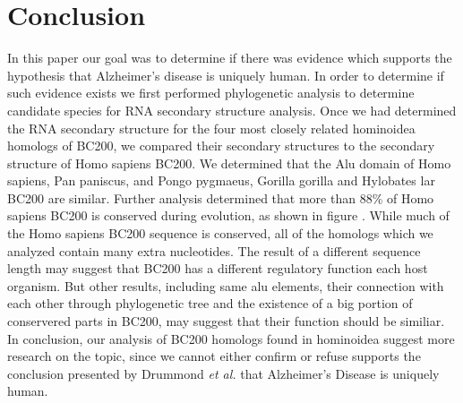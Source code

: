 \documentclass[conference, 11pt]{IEEEtran}
\begin{document}
\section{Conclusion}\label{sec:conclusion}

In this paper our goal was to determine if there was evidence which supports the hypothesis that Alzheimer’s disease is uniquely human. In order to determine if such evidence exists we first performed phylogenetic analysis to determine candidate species for RNA secondary structure analysis. Once we had determined the RNA secondary structure for the four most closely related hominoidea homologs of BC200, we compared their secondary structures to the secondary structure of Homo sapiens BC200. We determined that the Alu domain of Homo sapiens, Pan paniscus, and Pongo pygmaeus, Gorilla gorilla and Hylobates lar BC200 are similar. Further analysis determined that more than 88\% of Homo sapiens BC200 is conserved during evolution, as shown in figure . While much of the Homo sapiens BC200 sequence is conserved, all of the homologs which we analyzed contain many extra nucleotides. The result of a different sequence length may suggest that BC200 has a different regulatory function each host organism. But other results, including same alu elements, their connection with each other through phylogenetic tree and the existence of a big portion of conservered parts in BC200, may suggest that their function should be similiar. In conclusion, our analysis of BC200 homologs found in hominoidea suggest more research on the topic, since we cannot either confirm or refuse supports the conclusion presented by Drummond \emph{et al.} that Alzheimer’s Disease is uniquely human.



\end{document}

